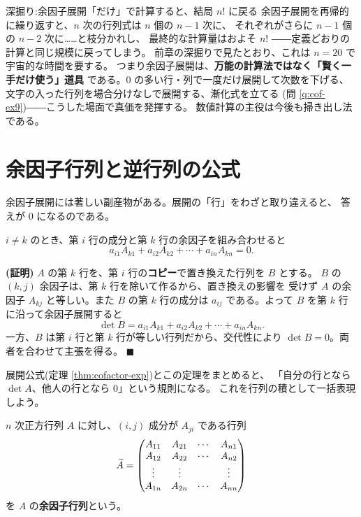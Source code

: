 \begin{itembox}[l]{深掘り:余因子展開「だけ」で計算すると、結局 $n!$ に戻る}
余因子展開を再帰的に繰り返すと、$n$ 次の行列式は $n$ 個の $n-1$ 次に、
それぞれがさらに $n-1$ 個の $n-2$ 次に……と枝分かれし、
最終的な計算量はおよそ $n!$ ――定義どおりの計算と同じ規模に戻ってしまう。
前章の深掘りで見たとおり、これは $n = 20$ で宇宙的な時間を要する。
つまり余因子展開は、\textbf{万能の計算法ではなく「賢く一手だけ使う」道具}
である。$0$ の多い行・列で一度だけ展開して次数を下げる、
文字の入った行列を場合分けなしで展開する、漸化式を立てる
(問 \ref{q:cof-ex9})――こうした場面で真価を発揮する。
数値計算の主役は今後も掃き出し法である。
\end{itembox}

\section{余因子行列と逆行列の公式}

余因子展開には著しい副産物がある。展開の「行」をわざと取り違えると、
答えが $0$ になるのである。

\begin{teiri}[異なる行の余因子との積]\label{thm:cofactor-zero}
$i \neq k$ のとき、第 $i$ 行の成分と第 $k$ 行の余因子を組み合わせると
\[
a_{i1} A_{k1} + a_{i2} A_{k2} + \cdots + a_{in} A_{kn} = 0.
\]
\end{teiri}

\noindent\textbf{(証明)}\quad
$A$ の第 $k$ 行を、第 $i$ 行の\textbf{コピー}で置き換えた行列を $B$ とする。
$B$ の $(k, j)$ 余因子は、第 $k$ 行を除いて作るから、置き換えの影響を
受けず $A$ の余因子 $A_{kj}$ と等しい。また $B$ の第 $k$ 行の成分は
$a_{ij}$ である。よって $B$ を第 $k$ 行に沿って余因子展開すると
\[
\det B = a_{i1} A_{k1} + a_{i2} A_{k2} + \cdots + a_{in} A_{kn}.
\]
一方、$B$ は第 $i$ 行と第 $k$ 行が等しい行列だから、交代性により
$\det B = 0$。両者を合わせて主張を得る。 $\blacksquare$

展開公式(定理 \ref{thm:cofactor-exp})とこの定理をまとめると、
「自分の行となら $\det A$、他人の行となら $0$」という規則になる。
これを行列の積として一括表現しよう。

\begin{teigi}[余因子行列]\label{def:adjugate}
$n$ 次正方行列 $A$ に対し、$(i, j)$ 成分が $A_{ji}$ である行列
\[
\widetilde{A} = \begin{pmatrix}A_{11} & A_{21} & \cdots & A_{n1} \\
A_{12} & A_{22} & \cdots & A_{n2} \\
\vdots & \vdots & & \vdots \\
A_{1n} & A_{2n} & \cdots & A_{nn}\end{pmatrix}
\]
を $A$ の\textbf{余因子行列}という。
\end{teigi}

